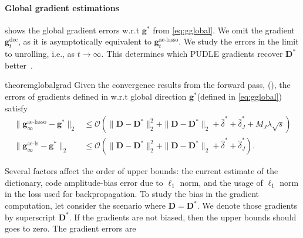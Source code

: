 \documentclass[10pt]{article} %
\newcommand{\D}{{\bm D}}
\newcommand{\g}{{\bm g}}
\begin{document}
\paragraph{Global gradient estimations}  shows the global gradient errors w.r.t $\g^{\ast}$ from \eqref{eq:gglobal}. We omit the gradient $\g_t^{\text{dec}}$, as it is asymptotically equivalent to  $\g_t^{\text{ae-lasso}}$. We study the errors in the limit to unrolling, i.e., as $t \rightarrow \infty$. This determines which PUDLE gradients recover $\D^{\ast}$ better~\citep{devolder2013first, devolder2014first}.
%
\begin{restatable}{theorem}{globalgrad}\label{thm:globalgradient}
Given the convergence results from the forward pass, (), the errors of gradients defined in  w.r.t global direction $\g^{\ast}$(defined in \eqref{eq:gglobal}) satisfy
\begin{equation}\label{eq:glocalconv}
\begin{aligned}
\| \g_{\infty}^{\text{ae-lasso}}  - \g^{\ast} \|_2 &\leq  \mathcal{O}(\|  \D - \D^{\ast} \|_2^2 + \|  \D - \D^{\ast} \|_2 + \hat \delta^{\ast} + \hat \delta_J^{\ast} + M_J \lambda \sqrt{s})\\
\| \g_{\infty}^{\text{ae-ls}}  -  \g^{\ast} \|_2 &\leq \mathcal{O}(\|  \D - \D^{\ast} \|_2^2 + \|  \D - \D^{\ast} \|_2 + \hat \delta^{\ast} + \hat \delta_J^{\ast}).
\end{aligned}
\end{equation}
\end{restatable}
%
%
Several factors affect the order of upper bounds: the current estimate of the dictionary, code amplitude-bias error due to $\ell_1$ norm, and the usage of $\ell_1$ norm in the loss used for backpropagation. To study the bias in the gradient computation, let consider the scenario where $\D = \D^{\ast}$. We denote those gradients by superscript $\D^{\ast}$. If the gradients are not biased, then the upper bounds should goes to zero. The gradient errors are
\end{document}
